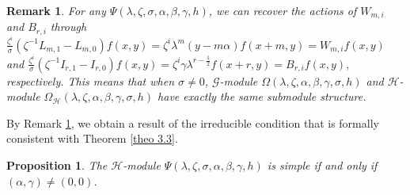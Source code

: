 \documentclass[12pt,reqno]{amsart}
\numberwithin{equation}{section}
\newtheorem{prop}[theo]{Proposition}
\newtheorem{rema}[theo]{Remark}
\begin{document}
\begin{rema}\label{rema 5.1}
    For any $\Psi(\lambda,\zeta,\sigma,\alpha,\beta,\gamma,h)$,  we can recover the actions of $W_{m,i}$ and $B_{r,i}$ through
$\frac{\zeta^i}{\sigma}(\zeta^{-1}L_{m,1}-L_{m,0})f(x,y)=\zeta^i\lambda^m(y-m\alpha)f(x+m,y)=W_{m,i}f(x,y)$
and $ \frac{\zeta^i}{\sigma}(\zeta^{-1}I_{r,1}-I_{r,0})f(x,y)= \zeta^i\gamma\lambda^{r-\frac12}f(x+r,y)=B_{r,i}f(x,y),$
respectively. This means that when $\sigma\neq 0$, $\mathcal{G}$-module $\Omega(\lambda,\zeta,\alpha,\beta,\gamma,\sigma,h)$ and $\mathcal{H}$-module $\Omega_{\mathcal{H}}(\lambda,\zeta,\alpha,\beta,\gamma,\sigma,h)$ have exactly the same submodule structure.
\end{rema}
 

By Remark \ref{rema 5.1}, we obtain a result of the irreducible condition that is formally consistent with Theorem \ref{theo 3.3}.
\begin{prop}\label{prop 5.1}
The $\mathcal{H}$-module $\Psi(\lambda,\zeta,\sigma,\alpha,\beta,\gamma,h)$ is simple if and only if $(\alpha, \gamma)\neq(0,0)$.
\end{prop}
\end{document}
